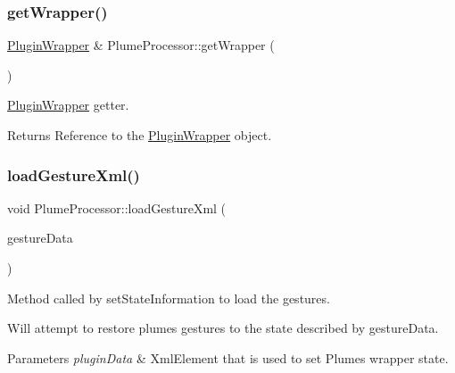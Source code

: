 \subsubsection{\texorpdfstring{get\+Wrapper()}{getWrapper()}}
{\footnotesize\ttfamily \mbox{\hyperlink{class_plugin_wrapper}{Plugin\+Wrapper}} \& Plume\+Processor\+::get\+Wrapper (\begin{DoxyParamCaption}{ }\end{DoxyParamCaption})}



\mbox{\hyperlink{class_plugin_wrapper}{Plugin\+Wrapper}} getter. 

\begin{DoxyReturn}{Returns}
Reference to the \mbox{\hyperlink{class_plugin_wrapper}{Plugin\+Wrapper}} object. 
\end{DoxyReturn}
\mbox{\label{class_plume_processor_a988e2a3ce47486bd8dfc5d5702420a7e}} 
\subsubsection{\texorpdfstring{load\+Gesture\+Xml()}{loadGestureXml()}}
{\footnotesize\ttfamily void Plume\+Processor\+::load\+Gesture\+Xml (\begin{DoxyParamCaption}\item[{const Xml\+Element \&}]{gesture\+Data }\end{DoxyParamCaption})}



Method called by set\+State\+Information to load the gestures. 

Will attempt to restore plume\textquotesingle{}s gestures to the state described by gesture\+Data.


\begin{DoxyParams}{Parameters}
{\em plugin\+Data} & Xml\+Element that is used to set Plume\textquotesingle{}s wrapper state. \\
\hline
\end{DoxyParams}
\mbox{\label{class_plume_processor_a08587fb2663557a8250132502785205c}} 
